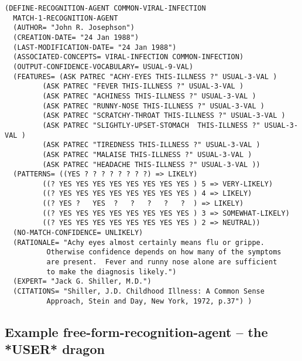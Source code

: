 \begin{verbatim}
(DEFINE-RECOGNITION-AGENT COMMON-VIRAL-INFECTION
  MATCH-1-RECOGNITION-AGENT
  (AUTHOR= "John R. Josephson")
  (CREATION-DATE= "24 Jan 1988")
  (LAST-MODIFICATION-DATE= "24 Jan 1988")
  (ASSOCIATED-CONCEPTS= VIRAL-INFECTION COMMON-INFECTION)
  (OUTPUT-CONFIDENCE-VOCABULARY= USUAL-9-VAL)
  (FEATURES= (ASK PATREC "ACHY-EYES THIS-ILLNESS ?" USUAL-3-VAL )
	     (ASK PATREC "FEVER THIS-ILLNESS ?" USUAL-3-VAL )
	     (ASK PATREC "ACHINESS THIS-ILLNESS ?" USUAL-3-VAL )
	     (ASK PATREC "RUNNY-NOSE THIS-ILLNESS ?" USUAL-3-VAL )
	     (ASK PATREC "SCRATCHY-THROAT THIS-ILLNESS ?" USUAL-3-VAL )
	     (ASK PATREC "SLIGHTLY-UPSET-STOMACH  THIS-ILLNESS ?" USUAL-3-VAL )
	     (ASK PATREC "TIREDNESS THIS-ILLNESS ?" USUAL-3-VAL )
	     (ASK PATREC "MALAISE THIS-ILLNESS ?" USUAL-3-VAL )
	     (ASK PATREC "HEADACHE THIS-ILLNESS ?" USUAL-3-VAL ))
  (PATTERNS= ((YES ? ? ? ? ? ? ? ?) => LIKELY)
	     ((? YES YES YES YES YES YES YES YES ) 5 => VERY-LIKELY)
	     ((? YES YES YES YES YES YES YES YES ) 4 => LIKELY)
	     ((? YES ?   YES  ?   ?   ?   ?   ?  ) => LIKELY)
	     ((? YES YES YES YES YES YES YES YES ) 3 => SOMEWHAT-LIKELY)
	     ((? YES YES YES YES YES YES YES YES ) 2 => NEUTRAL))
  (NO-MATCH-CONFIDENCE= UNLIKELY)
  (RATIONALE= "Achy eyes almost certainly means flu or grippe.
	      Otherwise confidence depends on how many of the symptoms
	      are present.  Fever and runny nose alone are sufficient
	      to make the diagnosis likely.")
  (EXPERT= "Jack G. Shiller, M.D.")
  (CITATIONS= "Shiller, J.D. Childhood Illness: A Common Sense
	      Approach, Stein and Day, New York, 1972, p.37") )
\end{verbatim}

\subsection{Example free-form-recognition-agent -- the *USER*
dragon\label{*user*}}

